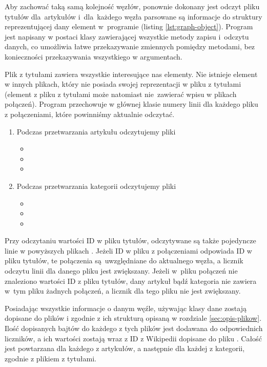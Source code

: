Aby zachować taką samą kolejność węzłów, ponownie dokonany jest odczyt pliku tytułów dla~artykułów i~dla~każdego węzła parsowane są informacje do struktury reprezentującej dany element w~programie (listing \ref{lst:graph-object}). Program jest napisany w postaci klasy zawierającej wszystkie metody zapisu i~odczytu danych, co umożliwia łatwe przekazywanie zmiennych pomiędzy metodami, bez konieczności przekazywania wszystkiego w argumentach.

Plik z tytułami zawiera wszystkie interesujące nas elementy. Nie istnieje element w innych plikach, który nie posiada swojej reprezentacji w pliku z tytułami (element z pliku z tytułami może natomiast nie~zawierać wpisu w plikach połączeń). Program przechowuje w głównej klasie numery linii dla każdego pliku z połączeniami, które powinniśmy aktualnie odczytać.

\begin{enumerate}
\item Podczas przetwarzania artykułu odczytujemy pliki
\begin{itemize}[label=\textbullet]
    \item  {}
    \item  {}
    \item  {}
\end{itemize}
\item Podczas przetwarzania kategorii odczytujemy pliki
\begin{itemize}[label=\textbullet]
    \item  {}
    \item  {}
    \item  {}
\end{itemize}
\end{enumerate}

Przy odczytaniu wartości ID w pliku tytułów, odczytywane są także pojedyncze linie w powyższych plikach . Jeżeli ID w pliku z połączeniami odpowiada ID w pliku tytułów, te połączenia są~uwzględniane do aktualnego węzła, a licznik odczytu linii dla danego pliku jest zwiększany. Jeżeli w~pliku połączeń nie znaleziono wartości ID z pliku tytułów, dany artykuł bądź kategoria nie zawiera w~tym pliku  żadnych połączeń, a licznik dla tego pliku nie jest zwiększany.

Posiadając wszystkie informacje o danym węźle, używając klasy  dane zostają dopisane do plików  i  zgodnie z ich strukturą opisaną w rozdziale \ref{sec:opis-plikow}. Ilość dopisanych bajtów do każdego z tych plików jest dodawana do odpowiednich liczników, a ich wartości zostają wraz z ID z Wikipedii dopisane do pliku . Całość jest powtarzana dla każdego z artykułów, a następnie dla każdej z kategorii, zgodnie z plikiem z tytułami.

